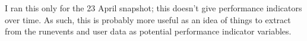 \documentclass{article}
\begin{document}
I ran this only for the 23 April snapshot;
this doesn't give performance indicators
over time. As such, this is probably more
useful as an idea of things to extract from
the runevents and user data as potential
performance indicator variables.
\end{document}

